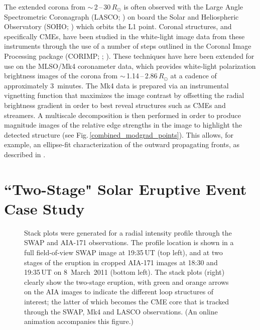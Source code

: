 \documentclass[namedreferences]{solarphysics}
\begin{document}
\begin{article}
The extended corona from $\sim$\,2\,--\,30\,$R_{\odot}$ is often observed with the Large Angle Spectrometric Coronagraph (LASCO; )  on board the Solar and Heliospheric Observatory (SOHO; ) which orbits the L1 point. Coronal structures, and specifically CMEs, have been studied in the white-light image data from these instruments through the use of a number of steps outlined in the Coronal Image Processing package (CORIMP; ; ). These techniques have here been extended for use on the MLSO/Mk4 coronameter data, which provides white-light polarization brightness images of the corona from $\sim$\,1.14\,--\,2.86\,$R_{\odot}$ at a cadence of approximately 3~minutes. The Mk4 data is prepared via an instrumental vignetting function that maximizes the image contrast by offsetting the radial brightness gradient in order to best reveal structures such as CMEs and streamers. A multiscale decomposition is then performed in order to produce magnitude images of the relative edge strengths in the image to highlight the detected structure (see Fig.\,\ref{combined_modgrad_points}). This allows, for example, an ellipse-fit characterization of the outward propagating fronts, as described in .



\section{``Two-Stage" Solar Eruptive Event Case Study}
\label{sect:event}

\begin{figure}[t]
\caption{Stack plots were generated for a radial intensity profile through the SWAP and AIA-171 observations. The profile location is shown in a full field-of-view SWAP image at 19:35\,UT (top left), and at two stages of the eruption in cropped AIA-171 images at 18:30 and 19:35\,UT on 8~March~2011 (bottom left). The stack plots (right) clearly show the two-stage eruption, with green and orange arrows on the AIA images to indicate the different loop structures of interest; the latter of which becomes the CME core that is tracked through the SWAP, Mk4 and LASCO observations. (An online animation accompanies this figure.)}
\label{stackplots}
\end{figure}


\end{article}
\end{document}
